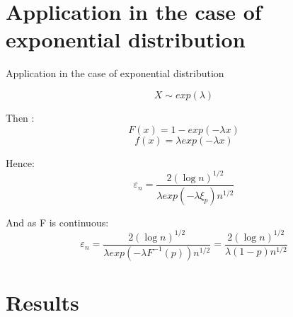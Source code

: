 \documentclass{beamer}
\begin{document}
\section{Application in the case of exponential distribution}
\begin{frame}[fragile]{Application in the case of exponential distribution}

$$X \sim exp(\lambda) $$

Then :
$$F(x)= 1 - exp(-\lambda x)$$
$$f(x) = \lambda exp(-\lambda x) $$

Hence:
$$\varepsilon_n = \frac{2(\log{n})^{1/2}}{\lambda exp(-\lambda \xi_p)n^{1/2}}$$

And as F is continuous:
$$\varepsilon_n = \frac{2(\log{n})^{1/2}}{\lambda exp(-\lambda F^{-1}(p))n^{1/2}} = \frac{2(\log{n})^{1/2}}{\lambda(1-p)n^{1/2}}$$


\end{frame}

\section{Results}
\end{document}

